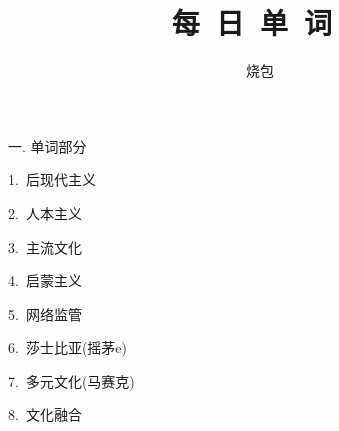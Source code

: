 \documentclass[a4paper, 12pt]{article}
\begin{document}
    \noindent

    \title{每\ 日\ 单\ 词\ }
    \author{烧包}
    \maketitle

\begin{flushleft}
一. 单词部分
\end{flushleft}

\begin{multicols}{2}
\begin{flushleft}
1.\ 后现代主义 \ \ \ \ \underline{\hspace{3cm}}
\end{flushleft}

\begin{flushleft}
2.\ 人本主义 \ \ \ \ \underline{\hspace{3cm}}
\end{flushleft}
\end{multicols}

\begin{multicols}{2}
\begin{flushleft}
3.\ 主流文化 \ \ \ \ \underline{\hspace{3cm}}
\end{flushleft}

\begin{flushleft}
4.\ 启蒙主义 \ \ \ \ \underline{\hspace{3cm}}
\end{flushleft}
\end{multicols}

\begin{multicols}{2}
\begin{flushleft}
5.\ 网络监管 \ \ \ \ \underline{\hspace{3cm}}
\end{flushleft}

\begin{flushleft}
6.\ 莎士比亚(摇茅e) \ \ \ \ \underline{\hspace{3cm}}
\end{flushleft}
\end{multicols}

\begin{multicols}{2}
\begin{flushleft}
7.\ 多元文化(马赛克) \ \ \ \ \underline{\hspace{3cm}}
\end{flushleft}

\begin{flushleft}
8.\ 文化融合 \ \ \ \ \underline{\hspace{3cm}}
\end{flushleft}
\end{multicols}
\end{document}
